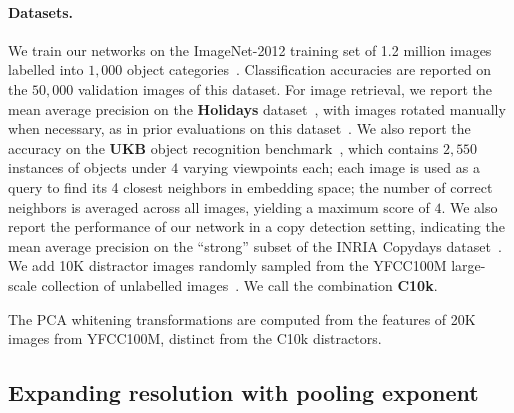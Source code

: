 \paragraph{Datasets.} We train our networks on the ImageNet-2012 training set of 1.2 million images labelled into $1,\!000$ object categories~\cite{ILSVRC15}. 
Classification accuracies are reported on the $50,\!000$ validation images of this dataset.
For image retrieval, we report the mean average precision on the {\bf Holidays} dataset~\cite{Jegou2008HammingEA}, with images rotated manually when necessary, as in prior evaluations on this dataset~\cite{Gordo2016DeepIR}. 
We also report the accuracy on the {\bf UKB} object recognition benchmark~\cite{nister2006scalable}, which contains $2,\!550$ instances of objects under $4$ varying viewpoints each; each image is used as a query to find its 4 closest neighbors in embedding space; the number of correct neighbors is averaged across all images, yielding a maximum score of $4$. 
We also report the performance of our network in a copy detection setting, indicating the mean average precision on the ``strong'' subset of the INRIA Copydays dataset~\cite{Douze2009EvaluationOG}.
We add 10K distractor images randomly sampled from the YFCC100M large-scale collection of unlabelled images~\cite{Thomee2016YFCC100MTN}.
We call the combination {\bf C10k}.

The PCA whitening transformations are computed from the features of 20K images from YFCC100M, distinct from the C10k distractors. 

%
%
%

\subsection{Expanding resolution with pooling exponent\label{sec:expand-pooling}}


